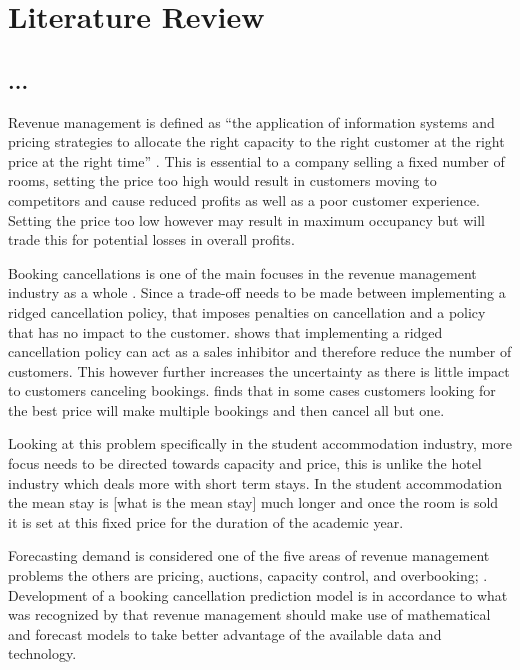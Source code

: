 \chapter{Literature Review}
\label{ch:lit_rev}
\section{...}
Revenue management is defined as “the application of information systems and pricing strategies to allocate the right capacity to the right customer at the right price at the right time” \cite{Kimes2003HasAcceptable}. This is essential to a company selling a fixed number of rooms, setting the price too high would result in customers moving to competitors and cause reduced profits as well as a poor customer experience. Setting the price too low however may result in maximum occupancy but will trade this for potential losses in overall profits.

\vspace{5mm}

Booking cancellations is one of the main focuses in the revenue management industry as a whole \cite{Subramanian1999AirlineNo-shows}. Since a trade-off needs to be made between implementing a ridged cancellation policy, that imposes penalties on cancellation and a policy that has no impact to the customer. \cite{Jinhong2007ServiceCancellations} shows that implementing a ridged cancellation policy can act as a sales inhibitor and therefore reduce the number of customers. This however further increases the uncertainty as there is little impact to customers canceling bookings. \cite{Talluri2004TheManagement} finds that in some cases customers looking for the best price will make multiple bookings and then cancel all but one. 

\vspace{5mm}

Looking at this problem specifically in the student accommodation industry, more focus needs to be directed towards capacity and price, this is unlike the hotel industry which deals more with short term stays. In the student accommodation the mean stay is [what is the mean stay] much longer and once the room is sold it is set at this fixed price for the duration of the academic year.
 \vspace{5mm}
 
 Forecasting demand is considered one of the five areas of revenue management problems the others are pricing, auctions, capacity control, and overbooking; \cite{Chiang2007AnResearch}. Development of a booking cancellation prediction model is in accordance to what was recognized by \cite{Chiang2007AnResearch} that revenue management should make use of mathematical and forecast models to take better advantage of the available data and technology.
 
